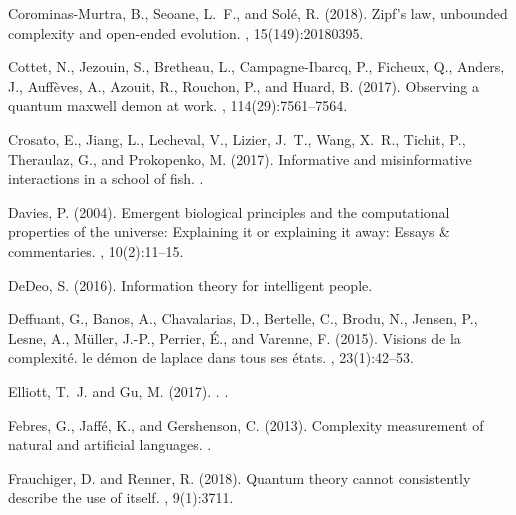 \begin{thebibliography}{}
Corominas-Murtra, B., Seoane, L.~F., and Sol{\'e}, R. (2018).
\newblock Zipf’s law, unbounded complexity and open-ended evolution.
, 15(149):20180395.

Cottet, N., Jezouin, S., Bretheau, L., Campagne-Ibarcq, P., Ficheux, Q.,
  Anders, J., Auff{\`e}ves, A., Azouit, R., Rouchon, P., and Huard, B. (2017).
\newblock Observing a quantum maxwell demon at work.
,
  114(29):7561--7564.

Crosato, E., Jiang, L., Lecheval, V., Lizier, J.~T., Wang, X.~R., Tichit, P.,
  Theraulaz, G., and Prokopenko, M. (2017).
\newblock Informative and misinformative interactions in a school of fish.
.

Davies, P. (2004).
\newblock Emergent biological principles and the computational properties of
  the universe: Explaining it or explaining it away: Essays \& commentaries.
, 10(2):11--15.

DeDeo, S. (2016).
\newblock Information theory for intelligent people.

Deffuant, G., Banos, A., Chavalarias, D., Bertelle, C., Brodu, N., Jensen, P.,
  Lesne, A., M{\"u}ller, J.-P., Perrier, {\'E}., and Varenne, F. (2015).
\newblock Visions de la complexit{\'e}. le d{\'e}mon de laplace dans tous ses
  {\'e}tats.
, 23(1):42--53.

{Elliott}, T.~J. and {Gu}, M. (2017).
.
.

Febres, G., Jaff{\'e}, K., and Gershenson, C. (2013).
\newblock Complexity measurement of natural and artificial languages.
.

Frauchiger, D. and Renner, R. (2018).
\newblock Quantum theory cannot consistently describe the use of itself.
, 9(1):3711.


\end{thebibliography}
